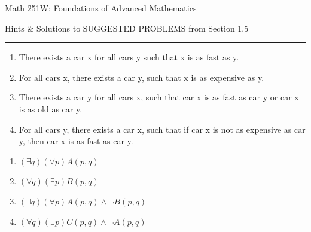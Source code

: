 \documentclass{article}
\theoremstyle{definition}
\begin{document}
	\begin{center}
		\Large{Math 251W: Foundations of Advanced Mathematics}

		\normalsize \normalsize Hints \& Solutions to SUGGESTED PROBLEMS from Section
		1.5
		\vspace{0.25cm}
		\hrule
		\vspace{0.75cm}
	\end{center}

	 \vspace{0.5cm}




	\noindent {}

	\begin{enumerate}
		\item There exists a car x for all cars y such that x is as fast as
		y.
		\item For all cars x, there exists a car y, such that x is as
		expensive as y.
		\item There exists a car y for all cars x, such that car x is as
		fast as car y or car x is as old as car y.
		\item For all cars y, there exists a car x, such that if car x is
		not as expensive as car y, then car x is as fast as car y.
	\end{enumerate}

	\vspace{0.6cm}



	\noindent {}

	\begin{enumerate}
		\item $(\exists q)(\forall p)A(p,q)$
		\item $(\forall q)(\exists p)B(p,q)$
		\item $(\exists q)(\forall p)A(p,q)\wedge\neg B(p,q)$
		\item $(\forall q)(\exists p)C(p,q)\wedge \neg A(p,q)$
	\end{enumerate}

	\vspace{0.6cm}

	\noindent {}
\end{document}
